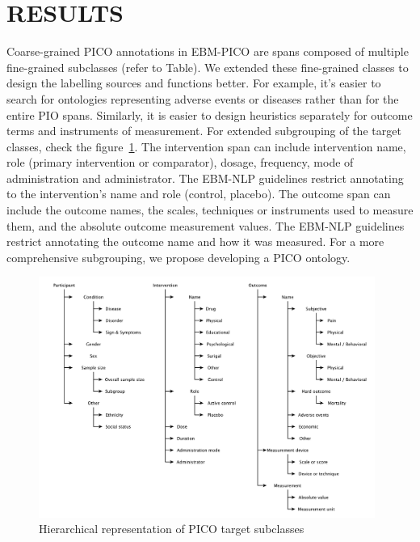 \documentclass[10.7pt,]{article}
\begin{document}
\section{RESULTS}\label{results}
%
Coarse-grained PICO annotations in EBM-PICO are spans composed of multiple fine-grained subclasses (refer to Table).
We extended these fine-grained classes to design the labelling sources and functions better.
For example, it's easier to search for ontologies representing adverse events or diseases rather than for the entire PIO spans.
Similarly, it is easier to design heuristics separately for outcome terms and instruments of measurement.
For extended subgrouping of the target classes, check the figure~\ref{fig:target_subgroups}.
The intervention span can include intervention name, role (primary intervention or comparator), dosage, frequency, mode of administration and administrator.
The EBM-NLP guidelines restrict annotating to the intervention's name and role (control, placebo).
The outcome span can include the outcome names, the scales, techniques or instruments used to measure them, and the absolute outcome measurement values.
The EBM-NLP guidelines restrict annotating the outcome name and how it was measured.
For a more comprehensive subgrouping, we propose developing a PICO ontology.
%
\begin{figure}[ht]
\centering
\includegraphics[width=0.98\textwidth]{figures/target_subgroups_.pdf}
\caption{\label{fig:target_subgroups} Hierarchical representation of PICO target subclasses}
\end{figure}
\end{document}
